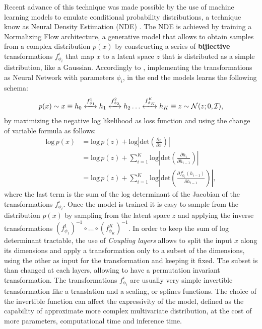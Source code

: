 Recent advance of this technique was made possible by the use of machine learning models to emulate conditional probability distributions, a technique know as Neural Density Estimation (NDE) \cite{papamakariosNeuralDensityEstimation2019}. The NDE is achieved by training a Normalizing Flow architecture, a generative model that allows to obtain samples from a complex distribution $p(x)$ by constructing a series of \textbf{bijiective} transformations  $f_{\phi_i}^i$ that map $x$ to a latent space $z$ that is distributed as a simple distribution, like a Gaussian. Accordingly to \cite{kingmaGlowGenerativeFlow2018}, implementing the transformations as Neural Network with parameters $\phi_i$, in the end the models learns the following schema:
\begin{equation}
p(x) \sim x \equiv h_0 \xleftrightarrow{\text{$f_{\phi_1}^1$}} h_1 \xleftrightarrow{\text{$f_{\phi_2}^2$}} h_2 \dots \xleftrightarrow{\text{$f_{\phi_K}^K$}} h_K \equiv z \sim \mathcal{N}(z; 0, \mathcal{I}),
\end{equation}
by maximizing the negative log likelihood as loss function and using the change of variable formula as follows:
\begin{equation}
\begin{aligned}
    \text{log} \, p(x) &= \text{log} \, p(z) + \text{log} \left| \text{det} \left( \frac{\partial z}{\partial x} \right) \right| \\
    &= \text{log} \, p(z) + \sum_{i=1}^K \text{log} \left| \text{det} \left( \frac{\partial h_{i}}{\partial h_{i-1}} \right) \right| \\
    &= \text{log} \, p(z) + \sum_{i=1}^K \text{log} \left| \text{det} \left( \frac{\partial f_{\phi_i}^i(h_{i-1})}{\partial h_{i-1}} \right) \right|,
\end{aligned}
\end{equation}
where the last term is the sum of the log determinant of the Jacobian of the transformations $f_{\phi_i}^i$. Once the model is trained it is easy to sample from the distribution $p(x)$ by sampling from the latent space $z$ and applying the inverse transformations $(f_{\phi_1}^1)^{-1} \circ \dots \circ (f_{\phi_K}^K)^{-1}$.
In order to keep the sum of log determinant tractable, the use of \textit{Coupling layers} allows to split the input $x$ along its dimensions and apply a transformation only to a subset of the dimensions, using the other as input for the transformation and keeping it fixed. The subset is than changed at each layers, allowing to have a permutation invariant transformation. The transformations $f^{i}_{\phi_i}$ are usually very simple invertible transformation like a translation and a scaling, or splines functions. The choice of the invertible function can affect the expressivity of the model, defined as the capability of approximate more complex multivariate distribution, at the cost of more parameters, computational time and inference time. 

